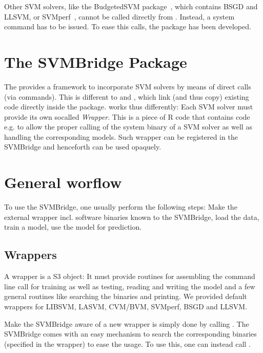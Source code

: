 \documentclass[article, shortnames]{jss}
\begin{document}
Other SVM solvers, like the BudgetedSVM package~\citep{djuric2014budgetedsvm}, 
which contains BSGD and LLSVM, or SVMperf~\citep{joachims2009sparse}, cannot 
be called directly from  .
Instead, a system command has to be issued.
To ease this calls, the  package has been developed.



\section{The SVMBridge Package}

The  provides a framework to incorporate 
SVM solvers by means of direct calls (via  commands).
This is different to  and , which link (and
thus copy) existing  code directly inside the package.
 works thus differently: Each SVM solver must provide
its own socalled {\it Wrapper}. This is a piece of R code that contains
code e.g. to allow the proper calling of the system binary of a SVM solver
as well as handling the corresponding models. Such wrapper can be
registered in the SVMBridge and henceforth can be used opaquely.





\section{General worflow}

To use the SVMBridge, one usually perform the following steps:
Make the external wrapper incl. software binaries known to the SVMBridge, 
load the data, train a model, use the model for prediction.



\subsection{Wrappers}

A wrapper is a S3 object: It must provide routines
for assembling the command line call for training as well as testing,
reading and writing the model and a few general routines like searching
the binaries and printing.
We provided default wrappers for LIBSVM, LASVM, CVM/BVM,
SVMperf, BSGD and LLSVM. 

Make the SVMBridge aware of a new wrapper is
simply done by calling .
The SVMBridge comes with an easy mechanism to search 
the corresponding binaries (specified in the wrapper) to ease
the usage. To use this, one can instead call .
\end{document}
